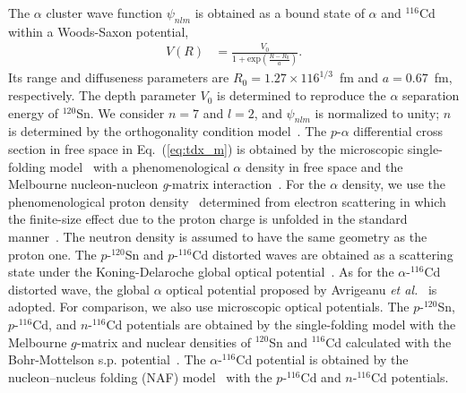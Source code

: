 \documentclass[%
 reprint,
superscriptaddress,
 amsmath,amssymb,
 aps,
]{revtex4-2}
\begin{document}
The $\alpha$ cluster wave function $\psi_{nlm}$ is obtained 
as a bound state of $\alpha$ and $^{116}$Cd within a Woods-Saxon 
potential,
\begin{align}
  V(R) &=
  \frac{V_0}{1+\mathrm{exp}\left(\frac{R-R_0}{a}\right)}.
\end{align}
Its range and diffuseness parameters are $R_0 = 1.27 \times 116^{1/3}$~fm and $a = 0.67$~fm, respectively.
The depth parameter $V_0$ is determined to reproduce the $\alpha$ separation energy of $^{120}$Sn.
We consider $n = 7$ and $l = 2$, and $\psi_{nlm}$ is normalized to unity; 
$n$ is determined by the orthogonality condition model~\cite{Saito1969}.
The $p$-$\alpha$ differential cross section in free space 
in Eq.~(\ref{eq:tdx_m}) is obtained by the microscopic single-folding 
model~\cite{Toyokawa13} with a
phenomenological $\alpha$ density in free space and the Melbourne nucleon-nucleon \textit{g}-matrix interaction~\cite{Amos00}.
For the $\alpha$ density, we use 
the phenomenological proton density~\cite{Vries1987} determined from 
electron scattering in which the finite-size effect 
due to the proton charge is unfolded in the standard manner~\cite{Singhal1978}.
The neutron density is assumed to have the same geometry as the proton one. 
The $p$-$^{120}$Sn and $p$-$^{116}$Cd distorted waves are obtained 
as a scattering state under the Koning-Delaroche 
global optical potential~\cite{Koning03}.
As for the $\alpha$-$^{116}$Cd distorted wave, the global $\alpha$ optical 
potential proposed by Avrigeanu \textit{et al.}~\cite{Avrigeanu94}
is adopted.
For comparison, we also use microscopic optical potentials. The $p$-$^{120}$Sn, $p$-$^{116}$Cd, and $n$-$^{116}$Cd potentials are obtained by the single-folding model with the Melbourne $g$-matrix and nuclear densities of $^{120}$Sn and $^{116}$Cd calculated with the Bohr-Mottelson s.p. potential~\cite{Bohr69}. The $\alpha$-$^{116}$Cd potential is obtained by the nucleon–nucleus folding (NAF) model~\cite{Egashira14} with the $p$-$^{116}$Cd and $n$-$^{116}$Cd potentials.
\end{document}
